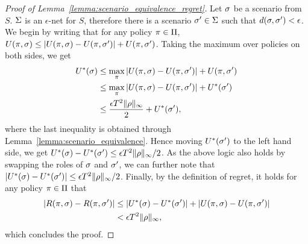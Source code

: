 \begin{proof}[Proof of Lemma~\ref{lemma:scenario_equivalence_regret}]
    Let $\sigma$ be a scenario from $S$. $\Sigma$ is an $\epsilon$-net for $S$, therefore there is a scenario $\sigma'\in\Sigma$ such that $d(\sigma, \sigma') < \epsilon$.
    We begin by writing that for any policy $\pi\in\Pi$, $U(\pi, \sigma) \leq |U(\pi, \sigma) - U(\pi, \sigma')| +  U(\pi, \sigma')$. Taking the maximum over policies on both sides, we get
    \begin{align}
        U^*(\sigma) &\leq \max_\pi |U(\pi, \sigma) - U(\pi, \sigma')| +  U(\pi, \sigma') \\
        & \leq \max_\pi |U(\pi, \sigma) - U(\pi, \sigma')| + U^*(\sigma')\\
        & \leq \dfrac{\epsilon T^2\lVert \rho \rVert_\infty}{2} + U^*(\sigma'),
    \end{align}
    where the last inequality is obtained through Lemma~\ref{lemma:scenario_equivalence}.
    Hence moving $U^*(\sigma')$ to the left hand side, we get $U^*(\sigma)- U^*(\sigma') \leq \epsilon T^2\lVert \rho \rVert_\infty/2 $. As the above logic also holds by swapping the roles of $\sigma$ and $\sigma'$, we can further note that $|U^*(\sigma)- U^*(\sigma')| \leq \epsilon T^2\lVert \rho \rVert_\infty/2 $.
    Finally, by the definition of regret, it holds for any policy $\pi\in\Pi$ that
    \begin{align}
        |R(\pi, \sigma)-R(\pi, \sigma')| &\leq |U^*(\sigma)- U^*(\sigma')| + |U(\pi, \sigma) - U(\pi, \sigma')| \\
        & < \epsilon T^2\lVert \rho \rVert_\infty,
    \end{align}
    which concludes the proof.
\end{proof}

